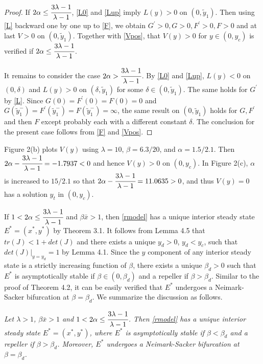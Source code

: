 \documentclass[11pt]{article}
\begin{document}
\begin{proof}
If  $2\alpha   \leq \cfrac{3\lambda-1}{\lambda-1} $,  \eqref{L0}
and \eqref{Lup} imply $L(y) >0$ on $(0, \tilde y_1)$. Then using
\eqref{L} backward one by one up to \eqref{F}, we obtain
$G^{\prime}>0, G>0,F^{\prime}>0, F>0$ and at last $V>0$ on  $(0,
\tilde y_1)$. Together with \eqref{Vpos},  that $V(y)>0$ for
$y\in(0, y_c)$ is verified if
$2\alpha\leq\cfrac{3\lambda-1}{\lambda-1}$.

It remains to consider the case  $2\alpha  >
\cfrac{3\lambda-1}{\lambda-1}$. By \eqref{L0}  and \eqref{Lup},
$L(y) <0$ on $(0, \delta)$ and
 $L(y) >0$ on $(\delta, \tilde y_1)$ for some $\delta \in  (0, \tilde y_1)$. The same holds for $G^{\prime}$ by \eqref{L}.
 Since $G(0)=F^{\prime}(0)=F(0) =0$  and $G(\tilde y_1^{-}) = F^{\prime}(\tilde y_1^{-}) =  F(\tilde y_1^{-}) = \infty$,
 the same result on $(0, \tilde y_1)$ holds for $ G, F^{\prime} $ and then $F $ except probably each with a different constant $\delta$.
The conclusion for the present case follows from \eqref{F} and
\eqref{Vpos}.
 \end{proof}

\medskip
Figure 2(b)  plots $V(y)$ using $\lambda=10$, $\beta=6.3/20$, and
$\alpha=1.5/2.1$. Then
$2\alpha-\cfrac{3\lambda-1}{\lambda-1}=-1.7937<0$ and hence
$V(y)>0$ on $(0, y_c)$. In Figure 2(c), $\alpha$ is increased to
$15/2.1$ so that
$2\alpha-\cfrac{3\lambda-1}{\lambda-1}=11.0635>0$, and thus
$V(y)=0$ has a solution $y_t$ in $(0, y_c)$.


  If
$1<2\alpha\leq\cfrac{3\lambda-1}{\lambda-1}$ and $\beta  \bar
x>1$, then \eqref{rmodel} has a unique interior steady state
$E^*=(x^*, y^*)$ by Theorem 3.1. It follows from Lemma 4.5 that
$tr(J)<1+det(J)$ and there exists a unique $y_d>0$, $y_d<y_c$,
such that $det(J)|_{y=y_d}=1$ by Lemma 4.1. Since the $y$
component of any interior steady state is a strictly increasing
function of $\beta$, there exists a unique $\beta_d>0$ such that
$E^*$ is asymptotically stable if $\beta\in(0, \beta_d)$ and a
repeller if $\beta>\beta_d$. Similar to the proof of Theorem 4.2,
it can be easily verified that $E^*$ undergoes a Neimark-Sacker
bifurcation at $\beta=\beta_d$. We summarize the discussion as
follows.

\medskip

 {\em Let $\lambda>1$, $\beta  \bar x>1$
and  $1<2\alpha\leq\cfrac{3\lambda-1}{\lambda-1}$. Then
\eqref{rmodel} has a unique interior steady state $E^*=(x^*,
y^*)$, where $E^*$ is asymptotically stable if $\beta<\beta_d$ and
a repeller if $\beta>\beta_d$. Moreover, $E^*$ undergoes a
Neimark-Sacker bifurcation at $\beta=\beta_d$.}
\end{document}
